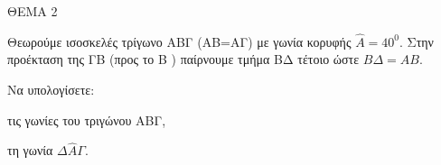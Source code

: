 
ΘΕΜΑ 2

Θεωρούμε ισοσκελές τρίγωνο ΑΒΓ (ΑΒ=ΑΓ) με γωνία κορυφής $\widehat{Α} = 40^{0}$. Στην προέκταση της ΓΒ (προς το Β ) παίρνουμε τμήμα ΒΔ τέτοιο ώστε $Β\Delta = ΑΒ$.

Να υπολογίσετε:

\begin{alist}
\item τις γωνίες του τριγώνου ΑΒΓ, 

\item τη γωνία $\Delta\widehat{Α}\Gamma$. 
\end{alist}
